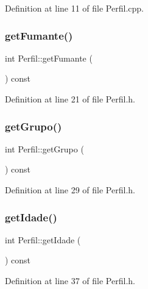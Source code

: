 Definition at line 11 of file Perfil.\+cpp.

\hypertarget{class_perfil_a235697fa0afc9536654196e7651393dd}{}\label{class_perfil_a235697fa0afc9536654196e7651393dd} 
\subsubsection{\texorpdfstring{get\+Fumante()}{getFumante()}}
{\footnotesize\ttfamily int Perfil\+::get\+Fumante (\begin{DoxyParamCaption}{ }\end{DoxyParamCaption}) const\hspace{0.3cm}{\ttfamily [inline]}}



Definition at line 21 of file Perfil.\+h.

\hypertarget{class_perfil_a4d7f7fd4f521e3054fd78ef180c2ef3b}{}\label{class_perfil_a4d7f7fd4f521e3054fd78ef180c2ef3b} 
\subsubsection{\texorpdfstring{get\+Grupo()}{getGrupo()}}
{\footnotesize\ttfamily int Perfil\+::get\+Grupo (\begin{DoxyParamCaption}{ }\end{DoxyParamCaption}) const\hspace{0.3cm}{\ttfamily [inline]}}



Definition at line 29 of file Perfil.\+h.

\hypertarget{class_perfil_a384c2efb684010011a4a42520433c03a}{}\label{class_perfil_a384c2efb684010011a4a42520433c03a} 
\subsubsection{\texorpdfstring{get\+Idade()}{getIdade()}}
{\footnotesize\ttfamily int Perfil\+::get\+Idade (\begin{DoxyParamCaption}{ }\end{DoxyParamCaption}) const\hspace{0.3cm}{\ttfamily [inline]}}



Definition at line 37 of file Perfil.\+h.

